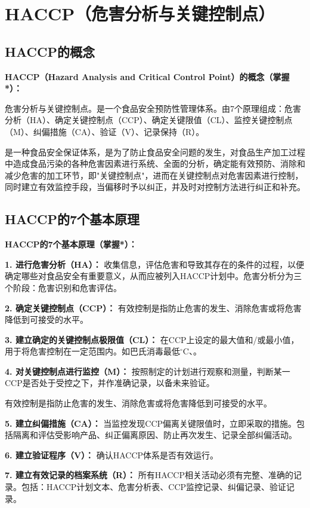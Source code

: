 \section{HACCP（危害分析与关键控制点）}

\subsection{HACCP的概念}

\begin{keybox}
\textbf{HACCP（Hazard Analysis and Critical Control Point）的概念（掌握*）：}

危害分析与关键控制点。是一个食品安全预防性管理体系。由7个原理组成：危害分析（HA）、确定关键控制点（CCP）、确定关键限值（CL）、监控关键控制点（M）、纠偏措施（CA）、验证（V）、记录保持（R）。

是一种食品安全保证体系，是为了防止食品安全问题的发生，对食品生产加工过程中造成食品污染的各种危害因素进行系统、全面的分析，确定能有效预防、消除和减少危害的加工环节，即"关键控制点"，进而在关键控制点对危害因素进行控制，同时建立有效监控手段，当偏移时予以纠正，并及时对控制方法进行纠正和补充。
\end{keybox}

\subsection{HACCP的7个基本原理}

\begin{keybox}
\textbf{HACCP的7个基本原理（掌握*）：}

\textbf{1. 进行危害分析（HA）：}
收集信息，评估危害和导致其存在的条件的过程，以便确定哪些对食品安全有重要意义，从而应被列入HACCP计划中。危害分析分为三个阶段：危害识别和危害评估。

\textbf{2. 确定关键控制点（CCP）：}
有效控制是指防止危害的发生、消除危害或将危害降低到可接受的水平。

\textbf{3. 建立确定的关键控制点极限值（CL）：}
在CCP上设定的最大值和/或最小值，用于将危害控制在一定范围内。如巴氏消毒最低$^\circ$C、。

\textbf{4. 对关键控制点进行监控（M）：}
按照制定的计划进行观察和测量，判断某一CCP是否处于受控之下，并作准确记录，以备未来验证。

有效控制是指防止危害的发生、消除危害或将危害降低到可接受的水平。

\textbf{5. 建立纠偏措施（CA）：}
当监控发现CCP偏离关键限值时，立即采取的措施。包括隔离和评估受影响产品、纠正偏离原因、防止再次发生、记录全部纠偏活动。

\textbf{6. 建立验证程序（V）：}
确认HACCP体系是否有效运行。

\textbf{7. 建立有效记录的档案系统（R）：}
所有HACCP相关活动必须有完整、准确的记录。包括：HACCP计划文本、危害分析表、CCP监控记录、纠偏记录、验证记录。
\end{keybox}

